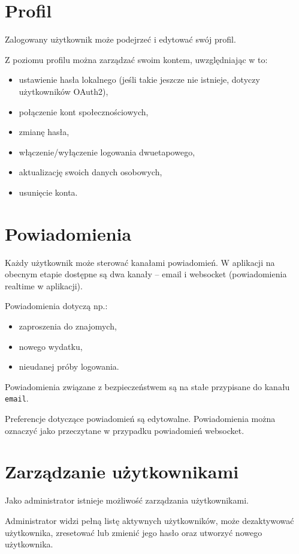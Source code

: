 \section{Profil}

Zalogowany użytkownik może podejrzeć i edytować swój profil.

Z poziomu profilu można zarządzać swoim kontem, uwzględniając w to:
\begin{itemize}
	\item ustawienie hasła lokalnego (jeśli takie jeszcze nie istnieje, dotyczy użytkowników OAuth2),
	\item połączenie kont społecznościowych,
	\item zmianę hasła,
	\item włączenie/wyłączenie logowania dwuetapowego,
	\item aktualizację swoich danych osobowych,
	\item usunięcie konta.
\end{itemize}

\section{Powiadomienia}

Każdy użytkownik może sterować kanałami powiadomień. W aplikacji na obecnym etapie dostępne są dwa kanały -- email i websocket (powiadomienia realtime w aplikacji).

Powiadomienia dotyczą np.:
\begin{itemize}
	\item zaproszenia do znajomych,
	\item nowego wydatku,
	\item nieudanej próby logowania.
\end{itemize}

Powiadomienia związane z bezpieczeństwem są na stałe przypisane do kanału \verb|email|.

Preferencje dotyczące powiadomień są edytowalne. Powiadomienia można oznaczyć jako przeczytane w przypadku powiadomień websocket.

\section{Zarządzanie użytkownikami}

Jako administrator istnieje możliwość zarządzania użytkownikami.

Administrator widzi pełną listę aktywnych użytkowników, może dezaktywować użytkownika, zresetować lub zmienić jego hasło oraz utworzyć nowego użytkownika.

